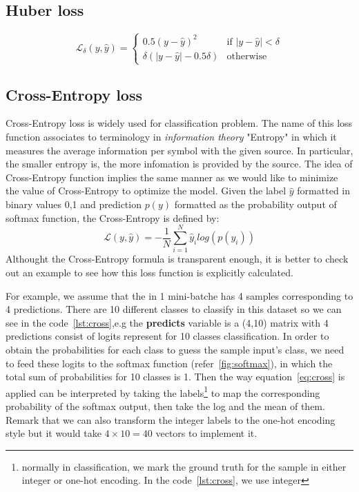 \subsection{Huber loss}
\begin{equation}
    \mathcal{L}_{\delta}(y,\hat{y}) = \begin{cases}
        0.5{(y - \hat{y})}^{2} & \text{if } |y-\hat{y}| < \delta\\
        \delta (|y-\hat{y}| - 0.5\delta)& \text{otherwise}
    \end{cases}
\end{equation}
\subsection{Cross-Entropy loss}
Cross-Entropy loss is widely used for classification problem. The name of this loss function associates to terminology in \textit{information theory} "Entropy" in which it measures the average information per symbol with the given source. In particular, the smaller entropy is, the more infomation is provided by the source. The idea of Cross-Entropy function implies the same manner as we would like to minimize the value of Cross-Entropy to optimize the model. Given the label $\hat{y}$ formatted in binary values {0,1} and prediction $p(y)$ formatted as the probability output of softmax function, the Cross-Entropy is defined by: 
\begin{equation}
    \label{eq:cross}
\mathcal{L}(y,\hat{y}) = -\frac{1}{N}\sum_{i=1}^{N}\hat{y}_{i}log(p(y_{i}))
\end{equation}
Althought the Cross-Entropy formula is transparent enough, it is better to check out an example to see how this loss function is explicitly calculated.\par
For example, we assume that the in 1 mini-batche has 4 samples corresponding to 4 predictions. There are 10 different classes to classify in this dataset so we can see in the code~\ref{lst:cross},e.g the \textbf{predicts} variable is a (4,10) matrix with 4 predictions consist of logits represent for 10 classes classification. In order to obtain the probabilities for each class to guess the sample input's class, we need to feed these logits to the softmax function (refer~\ref{fig:softmax}), in which the total sum of probabilities for 10 classes is 1. Then the way equation~\ref{eq:cross} is applied can be interpreted by taking the labels\footnote{normally in classification, we mark the ground truth for the sample in either integer or one-hot encoding. In the code~\ref{lst:cross}, we use integer} to map the corresponding probability of the softmax output, then take the log and the mean of them. Remark that we can also transform the integer labels to the one-hot encoding style but it would take $4\times10=40$ vectors to implement it.

